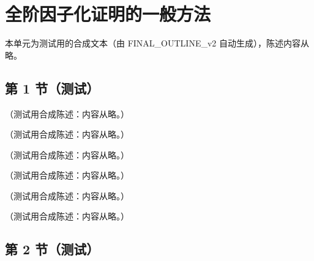 \chapter{全阶因子化证明的一般方法}\label{ch:method}
本单元为测试用的合成文本（由 FINAL\_OUTLINE\_v2 自动生成），陈述内容从略。

\section{第 1 节（测试）}\label{sec:method-strategy}

\begin{definition}[区域：逐线模式指派与偏序]\label{def:method-regions}
（测试用合成陈述：内容从略。）
\end{definition}

\begin{lemma}[逐线交与钳夹集的交]\label{lem:method-meets}
（测试用合成陈述：内容从略。）
\end{lemma}

\begin{definition}[积分范数意义下的幂次压低]\label{def:method-power-suppressed}
（测试用合成陈述：内容从略。）
\end{definition}

\begin{definition}\label{def:method-neighbourhoods}
（测试用合成陈述：内容从略。）
\end{definition}

\begin{lemma}[邻域覆盖]\label{lem:method-covering}
（测试用合成陈述：内容从略。）
\end{lemma}

\begin{definition}\label{def:method-collinear-approx}
（测试用合成陈述：内容从略。）
\end{definition}

\section{第 2 节（测试）}\label{sec:method-regions}

